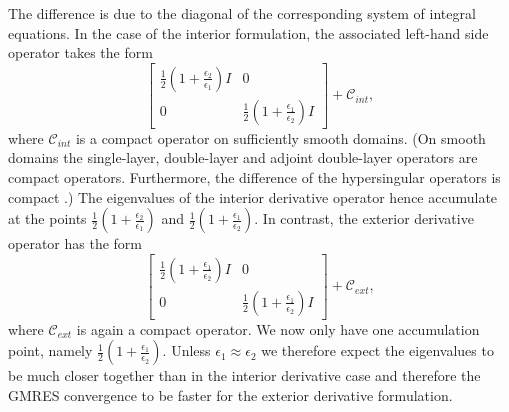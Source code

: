 The difference is due to the diagonal of the corresponding system of integral equations.
In the case of the interior formulation, the associated left-hand side operator takes the form
$$
\begin{bmatrix}\frac{1}{2}(1 + \frac{\epsilon_2}{\epsilon_1})I & 0 \\ 0 & \frac{1}{2}(1 + \frac{\epsilon_1}{\epsilon_2})I
\end{bmatrix} + \mathcal{C}_{int},
$$
where $\mathcal{C}_{int}$ is a compact operator on sufficiently smooth domains. (On smooth domains the single-layer, double-layer and adjoint double-layer operators are compact operators.
Furthermore, the difference of the hypersingular operators is compact \cite{Hiptmair2006-om}.)
The eigenvalues of the interior derivative operator hence accumulate at the points $\frac{1}{2}(1 + \frac{\epsilon_2}{\epsilon_1})$ and $\frac{1}{2}(1 + \frac{\epsilon_1}{\epsilon_2})$.
In contrast, the exterior derivative operator has the form
$$
\begin{bmatrix}\frac{1}{2}(1 + \frac{\epsilon_1}{\epsilon_2})I & 0 \\ 0 & \frac{1}{2}(1 + \frac{\epsilon_1}{\epsilon_2})I
\end{bmatrix} + \mathcal{C}_{ext},
$$
where $\mathcal{C}_{ext}$ is again a compact operator.
We now only have one accumulation point, namely $\frac{1}{2}(1 + \frac{\epsilon_1}{\epsilon_2})$.
Unless $\epsilon_1\approx \epsilon_2$ we therefore expect the eigenvalues to be much closer together than in the interior derivative case and therefore the GMRES convergence to be faster for the exterior derivative formulation.

